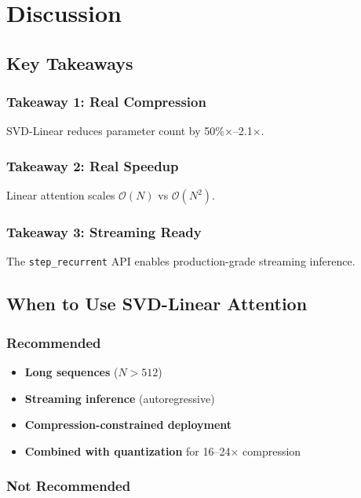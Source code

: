 
\section{Discussion}

\subsection{Key Takeaways}

\subsubsection{Takeaway 1: Real Compression}

SVD-Linear reduces parameter count by 50\%$\times$--2.1$\times$.

\subsubsection{Takeaway 2: Real Speedup}

Linear attention scales $\mathcal{O}(N)$ vs $\mathcal{O}(N^2)$.

\subsubsection{Takeaway 3: Streaming Ready}

The \texttt{step\_recurrent} API enables production-grade streaming inference.

\subsection{When to Use SVD-Linear Attention}

\subsubsection{Recommended}

\begin{itemize}
\item \textbf{Long sequences} ($N > 512$)
\item \textbf{Streaming inference} (autoregressive)
\item \textbf{Compression-constrained deployment}
\item \textbf{Combined with quantization} for 16--24$\times$ compression

\end{itemize}
\subsubsection{Not Recommended}

